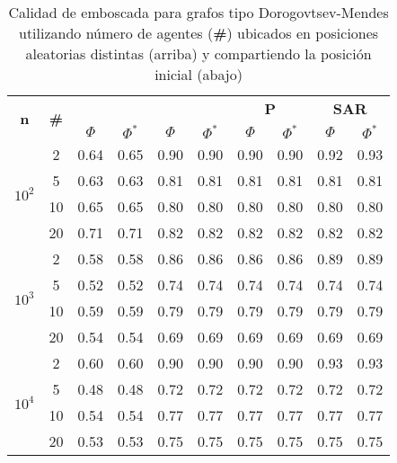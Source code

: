 \begin{table}[h]
	\caption{Calidad de emboscada para grafos tipo Dorogovtsev-Mendes
	utilizando n\'umero de agentes (\textbf{\#}) ubicados en
	posiciones aleatorias distintas (arriba) y compartiendo la posici\'on
	inicial (abajo)}
	\label{tab:ambush_dm}
	\centering
	\begin{small}
		\setlength{\tabcolsep}{4pt}
		\begin{tabular}{|c|c|cc|cc|cc|cc|}
			\hline
			\multirow{2}{*}{\textbf{n}} &
			\multirow{2}{*}{\textbf{\#}} &
			\multicolumn{2}{c|}{\textbf{\astar}} &
			\multicolumn{2}{c|}{\textbf{\ambush}} &
			\multicolumn{2}{c|}{\textbf{P}} &
			\multicolumn{2}{c|}{\textbf{SAR}}\\
			& & $\Phi$ & $\Phi^*$ & $\Phi$ & $\Phi^*$&
			$\Phi$ & $\Phi^*$& $\Phi$ & $\Phi^*$\\
			\hline
			\multirow{4}{*}{$10^2$}
			 & 2 & 0.64 & 0.65 & 0.90 & 0.90 & 0.90 & 0.90 & 0.92 & 0.93\\
			 & 5 & 0.63 & 0.63 & 0.81 & 0.81 & 0.81 & 0.81 & 0.81 & 0.81\\
			 & 10 & 0.65 & 0.65 & 0.80 & 0.80 & 0.80 & 0.80 & 0.80 & 0.80\\
			 & 20 & 0.71 & 0.71 & 0.82 & 0.82 & 0.82 & 0.82 & 0.82 & 0.82\\
			\hline
			\multirow{4}{*}{$10^3$}
			 & 2 & 0.58 & 0.58 & 0.86 & 0.86 & 0.86 & 0.86 & 0.89 & 0.89\\
			 & 5 & 0.52 & 0.52 & 0.74 & 0.74 & 0.74 & 0.74 & 0.74 & 0.74\\
			 & 10 & 0.59 & 0.59 & 0.79 & 0.79 & 0.79 & 0.79 & 0.79 & 0.79\\
			 & 20 & 0.54 & 0.54 & 0.69 & 0.69 & 0.69 & 0.69 & 0.69 & 0.69\\
			 \hline
			\multirow{4}{*}{$10^4$}
			 & 2 & 0.60 & 0.60 & 0.90 & 0.90 & 0.90 & 0.90 & 0.93 & 0.93\\
			 & 5 & 0.48 & 0.48 & 0.72 & 0.72 & 0.72 & 0.72 & 0.72 & 0.72\\
			 & 10 & 0.54 & 0.54 & 0.77 & 0.77 & 0.77 & 0.77 & 0.77 & 0.77\\
			 & 20 & 0.53 & 0.53 & 0.75 & 0.75 & 0.75 & 0.75 & 0.75 & 0.75\\
			 \hline
		\end{tabular}
		

\end{small}
\end{table}
